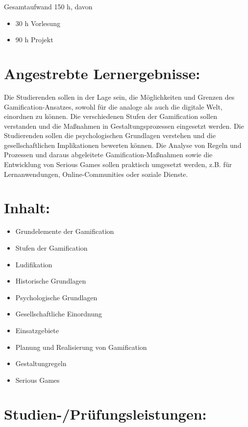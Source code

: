 Gesamtaufwand 150 h, davon

\begin{itemize}
\item
  30 h Vorlesung
\item
  90 h Projekt
\end{itemize}

\section*{Angestrebte
Lernergebnisse:}\label{angestrebte-lernergebnisse-23}

Die Studierenden sollen in der Lage sein, die Möglichkeiten und Grenzen
des Gamification-Ansatzes, sowohl für die analoge als auch die digitale
Welt, einordnen zu können. Die verschiedenen Stufen der Gamification
sollen verstanden und die Maßnahmen in Gestaltungsprozessen eingesetzt
werden. Die Studierenden sollen die psychologischen Grundlagen verstehen
und die gesellschaftlichen Implikationen bewerten können. Die Analyse
von Regeln und Prozessen und daraus abgeleitete Gamification-Maßnahmen
sowie die Entwicklung von Serious Games sollen praktisch umgesetzt
werden, z.B. für Lernanwendungen, Online-Communities oder soziale
Dienste.

\section*{Inhalt:}\label{inhalt-23}

\begin{itemize}
\item
  Grundelemente der Gamification
\item
  Stufen der Gamification
\item
  Ludifikation
\item
  Historische Grundlagen
\item
  Psychologische Grundlagen
\item
  Gesellschaftliche Einordnung
\item
  Einsatzgebiete
\item
  Planung und Realisierung von Gamification
\item
  Gestaltungregeln
\item
  Serious Games
\end{itemize}

\section*{Studien-/Prüfungsleistungen:}\label{studien-pruxfcfungsleistungen-18}

